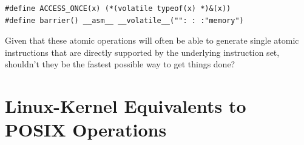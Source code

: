 \vspace{5pt}
{
\scriptsize
\begin{verbatim}
#define ACCESS_ONCE(x) (*(volatile typeof(x) *)&(x))
#define barrier() __asm__ __volatile__("": : :"memory")
\end{verbatim}
}
\vspace{5pt}

\QuickQuiz{}
	Given that these atomic operations will often be able to
	generate single atomic instructions that are directly
	supported by the underlying instruction set, shouldn't
	they be the fastest possible way to get things done?
 \QuickQuizEnd

\section{Linux-Kernel Equivalents to POSIX Operations}
\label{sec:toolsoftrade:Linux-Kernel Equivalents to POSIX Operations}


